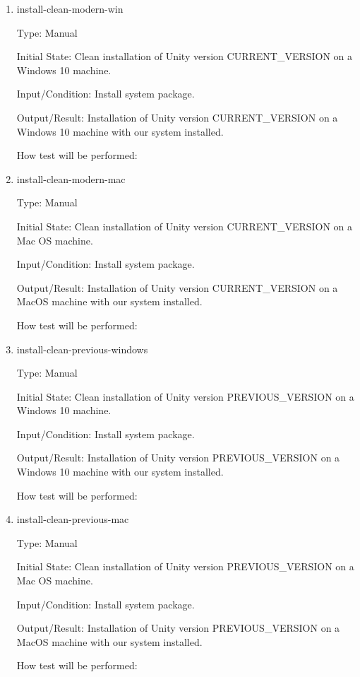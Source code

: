 \documentclass[12pt, titlepage]{article}
\begin{document}
\begin{enumerate}

\item{install-clean-modern-win\\}

Type: Manual
					
Initial State: Clean installation of Unity version CURRENT\_VERSION on a 
Windows 10 machine.
					
Input/Condition: Install system package.
					
Output/Result: Installation of Unity version CURRENT\_VERSION on a 
Windows 10 machine with our system installed.
					
How test will be performed: 

\item{install-clean-modern-mac\\}

Type: Manual

Initial State: Clean installation of Unity version CURRENT\_VERSION on a Mac OS 
machine.

Input/Condition: Install system package.

Output/Result: Installation of Unity version CURRENT\_VERSION on a 
MacOS machine with our system installed.

How test will be performed: 
					
\item{install-clean-previous-windows\\}

Type: Manual

Initial State: Clean installation of Unity version PREVIOUS\_VERSION on a 
Windows 10 machine.

Input/Condition: Install system package.

Output/Result: Installation of Unity version PREVIOUS\_VERSION on a 
Windows 10 machine with our system installed.

How test will be performed: 

\item{install-clean-previous-mac\\}

Type: Manual

Initial State: Clean installation of Unity version PREVIOUS\_VERSION on a Mac 
OS machine.

Input/Condition: Install system package.

Output/Result: Installation of Unity version PREVIOUS\_VERSION on a 
MacOS machine with our system installed.

How test will be performed: 

\end{enumerate}
\end{document}
